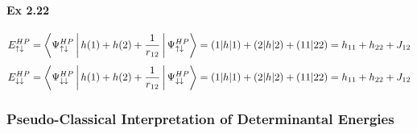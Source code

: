 \documentclass[a4paper]{article}
\newcommand{\ex}[1]{\paragraph{Ex #1}}
\numberwithin{equation}{subsection}
\begin{document}
\ex{2.22}
\begin{equation}\label{key}
E_{\uparrow\downarrow}^{HP} = \Braket{\Psi_{\uparrow\downarrow}^{HP} | h(1) + h(2) + \dfrac{1}{r_{12}} | \Psi_{\uparrow\downarrow}^{HP}} = (1|h|1)+(2|h|2)+(11|22) = h_{11}+h_{22}+J_{12}
\end{equation}
\begin{equation}\label{key}
E_{\downarrow\downarrow}^{HP} = \Braket{\Psi_{\downarrow\downarrow}^{HP} | h(1) + h(2) + \dfrac{1}{r_{12}} | \Psi_{\downarrow\downarrow}^{HP}} = (1|h|1)+(2|h|2)+(11|22) = h_{11}+h_{22}+J_{12}
\end{equation}

\subsubsection{Pseudo-Classical Interpretation of Determinantal Energies}
\end{document}
